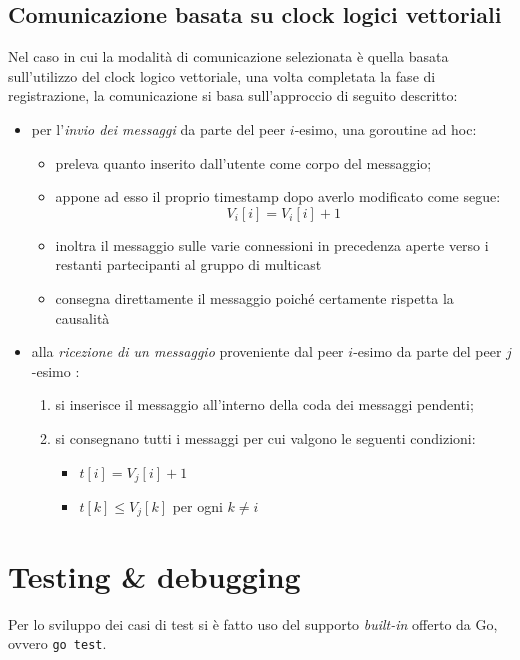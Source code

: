 \documentclass[conference]{IEEEtran}
\begin{document}
\subsection{Comunicazione basata su clock logici vettoriali}
Nel caso in cui la modalità di comunicazione selezionata è quella basata sull'utilizzo del clock logico vettoriale, una volta completata la fase di registrazione, la comunicazione si basa sull'approccio di seguito descritto:
\begin{itemize}
\item per l'\textsl{invio dei messaggi} da parte del peer $i$-esimo, una goroutine ad hoc:
\begin{itemize}
\item preleva quanto inserito dall'utente come corpo del messaggio;
\item appone ad esso il proprio timestamp dopo averlo modificato come segue:
\begin{equation}
V_i[i] = V_i[i] + 1
\end{equation}
\item inoltra il messaggio sulle varie connessioni in precedenza aperte verso i restanti partecipanti al gruppo di multicast
\item consegna direttamente il messaggio poiché certamente rispetta la causalità
\end{itemize}

\item alla \textsl{ricezione di un messaggio} proveniente dal peer $i$-esimo da parte del peer $j$-esimo :
\begin{enumerate}
\item si inserisce il messaggio all'interno della coda dei messaggi pendenti;
\item si consegnano tutti i messaggi per cui valgono le seguenti condizioni:
\begin{itemize}
\item $t[i] = V_j[i] + 1$
\item $t[k] \leq V_j[k]$ per ogni $k\neq i$
\end{itemize}
\end{enumerate}
\end{itemize}

\section{Testing \& debugging}
Per lo sviluppo dei casi di test si è fatto uso del supporto \textit{built-in} offerto da Go, ovvero \texttt{go test}.
\end{document}
